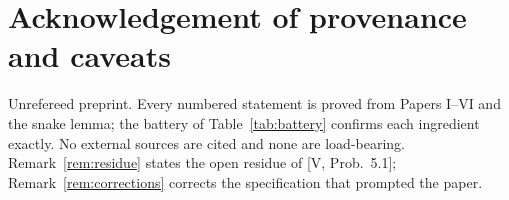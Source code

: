 \documentclass[11pt]{amsart}
\numberwithin{equation}{section}
\theoremstyle{definition}
\theoremstyle{remark}
\begin{document}
\section*{Acknowledgement of provenance and caveats}

Unrefereed preprint. Every numbered statement is proved from Papers I--VI and the
snake lemma; the battery of Table~\ref{tab:battery} confirms each ingredient
exactly. No external sources are cited and none are load-bearing.
Remark~\ref{rem:residue} states the open residue of [V, Prob.~5.1];
Remark~\ref{rem:corrections} corrects the specification that prompted the paper.
\end{document}
